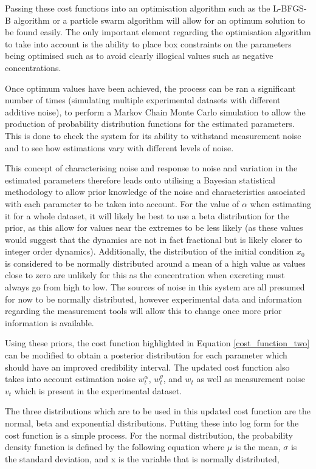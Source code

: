 Passing these cost functions into an optimisation algorithm such as the L-BFGS-B algorithm \cite{L_BFGS_B_Method} or a particle swarm algorithm \cite{wang2018particle} will allow for an optimum solution to be found easily. The only important element regarding the optimisation algorithm to take into account is the ability to place box constraints on the parameters being optimised such as to avoid clearly illogical values such as negative concentrations.

Once optimum values have been achieved, the process can be ran a significant number of times (simulating multiple experimental datasets with different additive noise), to perform a Markov Chain Monte Carlo simulation to allow the production of probability distribution functions for the estimated parameters. This is done to check the system for its ability to withstand measurement noise and to see how estimations vary with different levels of noise.

This concept of characterising noise and response to noise and variation in the estimated parameters therefore leads onto utilising a Bayesian statistical methodology to allow prior knowledge of the noise and characteristics associated with each parameter to be taken into account. For the value of $\alpha$ when estimating it for a whole dataset, it will likely be best to use a beta distribution for the prior, as this allow for values near the extremes to be less likely (as these values would suggest that the dynamics are not in fact fractional but is likely closer to integer order dynamics). Additionally, the distribution of the initial condition $x_{0}$ is considered to be normally distributed around a mean of a high value as values close to zero are unlikely for this as the concentration when excreting must always go from high to low. The sources of noise in this system are all presumed for now to be normally distributed, however experimental data and information regarding the measurement tools will allow this to change once more prior information is available. 

Using these priors, the cost function highlighted in Equation \ref{cost_function_two} can be modified to obtain a posterior distribution for each parameter which should have an improved credibility interval. The updated cost function also takes into account estimation noise $w_{t}^{\alpha}$, $w_{t}^{\theta}$, and $w_{t}$ as well as measurement noise $v_{t}$ which is present in the experimental dataset. 

The three distributions which are to be used in this updated cost function are the normal, beta and exponential distributions. Putting these into log form for the cost function is a simple process. For the normal distribution, the probability density function is defined by the following equation where $\mu$ is the mean, $\sigma$ is the standard deviation, and x is the variable that is normally distributed, 

